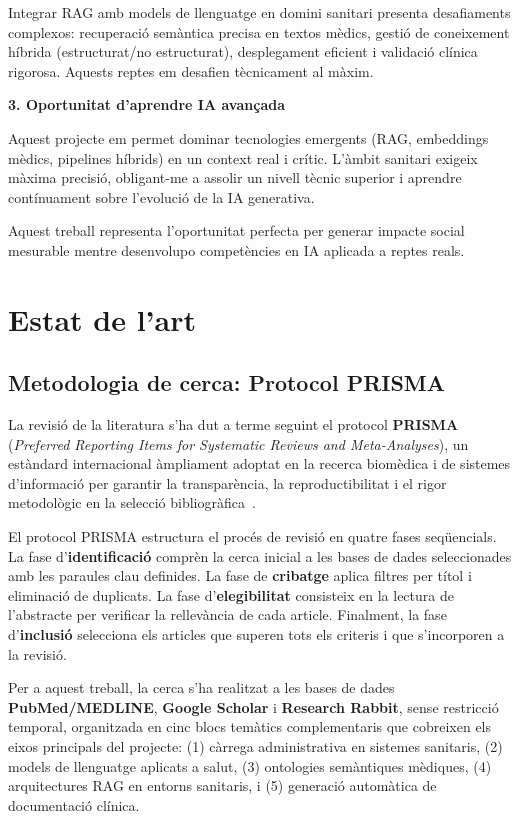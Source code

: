 \documentclass[11pt,a4paper]{article}
\begin{document}
Integrar RAG amb models de llenguatge en domini sanitari presenta desafiaments complexos: recuperació semàntica precisa en textos mèdics, gestió de coneixement híbrida (estructurat/no estructurat), desplegament eficient i validació clínica rigorosa. Aquests reptes em desafien tècnicament al màxim.

\textbf{3. Oportunitat d'aprendre IA avançada}  

Aquest projecte em permet dominar tecnologies emergents (RAG, embeddings mèdics, pipelines híbrids) en un context real i crític. L'àmbit sanitari exigeix màxima precisió, obligant-me a assolir un nivell tècnic superior i aprendre contínuament sobre l'evolució de la IA generativa.

Aquest treball representa l'oportunitat perfecta per generar impacte social mesurable mentre desenvolupo competències en IA aplicada a reptes reals.


\newpage
{}
\section*{Estat de l'art}

\subsection*{Metodologia de cerca: Protocol PRISMA}

La revisió de la literatura s'ha dut a terme seguint el protocol \textbf{PRISMA} (\textit{Preferred Reporting Items for Systematic Reviews and Meta-Analyses}), un estàndard internacional àmpliament adoptat en la recerca biomèdica i de sistemes d'informació per garantir la transparència, la reproductibilitat i el rigor metodològic en la selecció bibliogràfica~\cite{page2021prisma}.

El protocol PRISMA estructura el procés de revisió en quatre fases seqüencials. La fase d'\textbf{identificació} comprèn la cerca inicial a les bases de dades seleccionades amb les paraules clau definides. La fase de \textbf{cribatge} aplica filtres per títol i eliminació de duplicats. La fase d'\textbf{elegibilitat} consisteix en la lectura de l'abstracte per verificar la rellevància de cada article. Finalment, la fase d'\textbf{inclusió} selecciona els articles que superen tots els criteris i que s'incorporen a la revisió.

Per a aquest treball, la cerca s'ha realitzat a les bases de dades \textbf{PubMed/MEDLINE}, \textbf{Google Scholar} i \textbf{Research Rabbit}, sense restricció temporal, organitzada en cinc blocs temàtics complementaris que cobreixen els eixos principals del projecte: (1) càrrega administrativa en sistemes sanitaris, (2) models de llenguatge aplicats a salut, (3) ontologies semàntiques mèdiques, (4) arquitectures RAG en entorns sanitaris, i (5) generació automàtica de documentació clínica.
\end{document}

